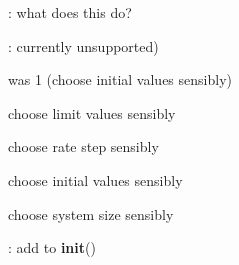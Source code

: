 
\begin{DoxyRefList}
\item[\label{todo__todo000001}%
\Hypertarget{todo__todo000001}%
Global \hyperlink{namespace_mu_mo_t_1_1_mu_mo_t_aa92c55a994d799a87d6bc8e0b08372ba}{Mu\+MoT\+:\+:Mu\+MoT.\+\_\+pydstoolify} (self, equation)]\+: what does this do?  
\item[\label{todo__todo000047}%
\Hypertarget{todo__todo000047}%
Global \hyperlink{class_mu_mo_t_1_1_mu_mo_t_1_1_mu_mo_tbifurcation_view_a17d5bd0e623faea6f50fc3b7f01d0d38}{Mu\+Mo\+Tbifurcation\+View.\+\_\+bifurcation\+Parameter} ]\+: currently unsupported)  
\item[\label{todo__todo000051}%
\Hypertarget{todo__todo000051}%
Global \hyperlink{class_mu_mo_t_1_1_mu_mo_t_1_1_mu_mo_tbifurcation_view_a6a353a1ef9443ae375948d592ed6cec6}{Mu\+Mo\+Tbifurcation\+View.\+\_\+choose\+Font\+Size} ]was 1 (choose initial values sensibly) 

choose limit values sensibly 

choose rate step sensibly 

choose initial values sensibly 

choose system size sensibly  
\item[\label{todo__todo000058}%
\Hypertarget{todo__todo000058}%
Global \hyperlink{class_mu_mo_t_1_1_mu_mo_t_1_1_mu_mo_tbifurcation_view_a797e92fe19ce2636a49bf1400a69fc49}{Mu\+Mo\+Tbifurcation\+View.\+\_\+py\+D\+Scont} ]\+: add to {\bfseries init}() 


\end{DoxyRefList}
